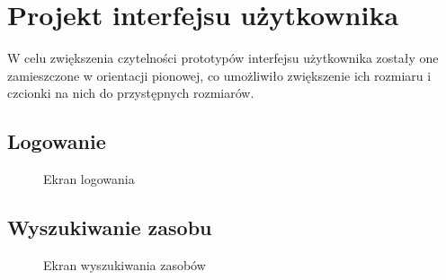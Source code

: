 \section{Projekt interfejsu użytkownika}

W celu zwiększenia czytelności prototypów interfejsu użytkownika
zostały one zamieszczone w orientacji pionowej, co umożliwiło
zwiększenie ich rozmiaru i czcionki na nich do przystępnych rozmiarów.

\subsection{Logowanie}

\begin{figure}[H]
	\centering
        \vfill
        \noindent
	\caption{Ekran logowania}
\end{figure}

\subsection{Wyszukiwanie zasobu}

\begin{figure}[H]
	\centering
        \vfill
        \noindent
	\caption{Ekran wyszukiwania zasobów}
\end{figure}

